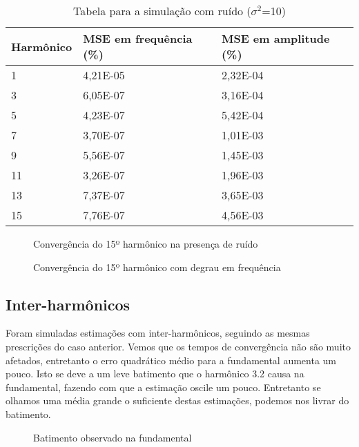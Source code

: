 \begin{table}[H]
	\centering
	\begin{tabular}{|p{2.5cm}|p{2.5cm}|p{2.5cm}|}
		\hline
		Harmônico & MSE em frequência (\%) & MSE em amplitude (\%)\\
		\hline
		1  & 4,21E-05 & 2,32E-04 \\
		3  & 6,05E-07 & 3,16E-04 \\
		5  & 4,23E-07 & 5,42E-04 \\
		7  & 3,70E-07 & 1,01E-03 \\
		9  & 5,56E-07 & 1,45E-03 \\
		11 & 3,26E-07 & 1,96E-03 \\
		13 & 7,37E-07 & 3,65E-03 \\
		15 & 7,76E-07 & 4,56E-03 \\
		\hline
	\end{tabular}
	\caption{Tabela para a simulação com ruído ($\sigma ^2$=10)}
\end{table}

\begin{figure}[H]
	\centering    
	\def\svgscale{1}
	
	\caption{Convergência do 15º harmônico na presença de ruído}
	\label{fig:esquema_pll}
\end{figure}

\begin{figure}[H]
	\centering    
	\def\svgscale{1}
	
	\caption{Convergência do 15º harmônico com degrau em frequência}
	\label{fig:esquema_pll}
\end{figure}

\subsection{Inter-harmônicos}

Foram simuladas estimações com inter-harmônicos, seguindo as mesmas prescrições do caso anterior. Vemos que os tempos de convergência não são muito afetados, entretanto o erro quadrático médio para a fundamental aumenta um pouco. Isto se deve a um leve batimento que o harmônico 3.2 causa na fundamental, fazendo com que a estimação oscile um pouco. Entretanto se olhamos uma média grande o suficiente destas estimações, podemos nos livrar do batimento.

\begin{figure}[H]
	\centering    
	\def\svgscale{1}
	
	\caption{Batimento observado na fundamental}
	\label{fig:esquema_pll}
\end{figure}

